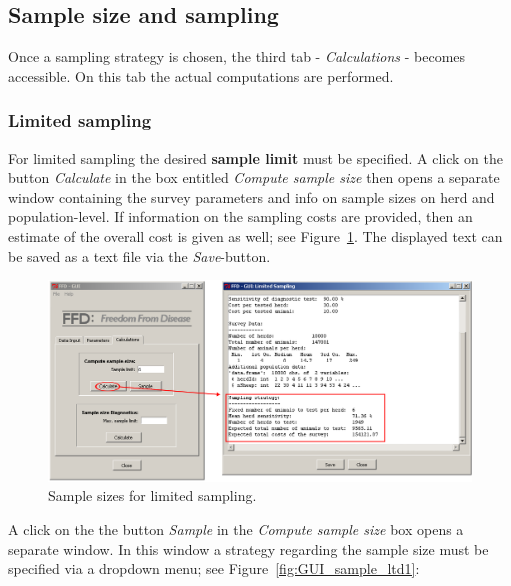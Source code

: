 \documentclass[nojss]{jss}
\begin{document}
\subsection{Sample size and sampling}
\label{subsec:GUI_sample size}

Once a sampling strategy is chosen, the third tab - \emph{Calculations} - becomes accessible. On this tab the actual computations are performed.

\subsubsection{Limited sampling}

For limited sampling the desired \textbf{sample limit} must be specified. A click on the button \emph{Calculate} in the box entitled \emph{Compute sample size} then opens a separate window containing the survey parameters and info on sample sizes on herd and population-level. If information on the sampling costs are provided, then an estimate of the overall cost is given as well; see Figure~\ref{fig:GUI_cald_ltd}. The displayed text can be saved as a text file via the \emph{Save}-button.

\begin{figure}[h!t]
\begin{center}
\includegraphics[width=120mm]{GUI_calc_ltd.png}
\end{center}
\caption{Sample sizes for limited sampling.} \label{fig:GUI_cald_ltd}
\end{figure}

A click on the the button \emph{Sample} in the \emph{Compute sample size} box opens a separate window. In this window a strategy regarding the sample size must be specified via a dropdown menu; see Figure~\ref{fig:GUI_sample_ltd1}:
\end{document}
